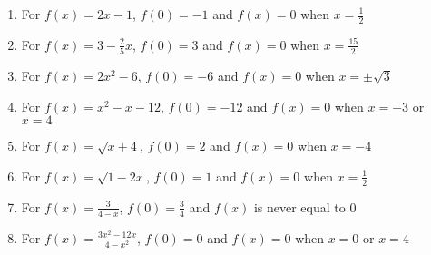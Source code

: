 \begin{enumerate}
\setcounter{enumi}{\value{HW}}

\item For $f(x) = 2x-1$,  $f(0) = -1$ and $f(x) = 0$ when $x = \frac{1}{2}$

\item For $f(x) =  3 - \frac{2}{5} x$, $f(0) = 3$ and $f(x) = 0$ when $x = \frac{15}{2}$

\item For $f(x) =  2x^2-6$, $f(0) = -6$ and $f(x) = 0$ when $x = \pm \sqrt{3}$

\item For $f(x) =  x^2-x-12$, $f(0) = -12$ and $f(x) = 0$ when $x = -3$ or $x=4$

\item For $f(x) =  \sqrt{x+4}$, $f(0) = 2$ and $f(x) = 0$ when $x =-4$

\item For $f(x) =  \sqrt{1-2x}$, $f(0) = 1$ and $f(x) = 0$ when $x = \frac{1}{2}$

\item For $f(x) =   \frac{3}{4-x}$, $f(0) = \frac{3}{4}$ and $f(x)$ is never equal to $0$

\item For $f(x) =   \frac{3x^2-12x}{4-x^2}$, $f(0) =0$ and $f(x) = 0$ when $x=0$ or $x=4$


\setcounter{HW}{\value{enumi}}
\end{enumerate}

